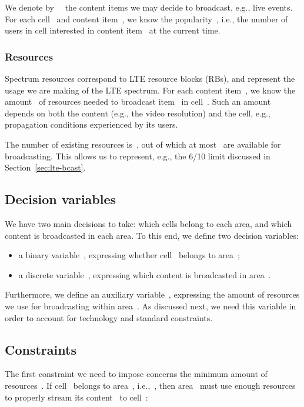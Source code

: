 \documentclass[10pt, conference, compsocconf]{IEEEtran}
\numberwithin{equation}{section}
\begin{document}
We denote by ~\ the content items we may decide to broadcast, e.g., live events.
For each cell~ and content item~, we know the popularity~, i.e., the number of users
in cell  interested in content item~ at the current time.

\subsubsection{Resources}

Spectrum resources correspond to LTE resource blocks (RBs), and represent the usage we are making
of the LTE spectrum.
For each content item~, we know the amount~ of resources needed to 
broadcast item~
in cell~. Such an amount depends on both the content (e.g., the
video resolution) and the cell, e.g., propagation conditions
experienced by its users.

The number of existing resources is~, out of which at most~ are available for broadcasting.
This allows us to represent, e.g., the 6/10 limit discussed in Section~\ref{sec:lte-bcast}.

\subsection{Decision variables}

We have two main decisions to take: which cells belong to each area, and which content is broadcasted
in each area. To this end, we define two decision variables:
\begin{itemize}
\item a binary variable~, expressing whether cell~ belongs to area~;
\item a discrete variable~, expressing which content is broadcasted in area~.
\end{itemize}

Furthermore, we define an auxiliary variable~, expressing the amount of resources we use for
broadcasting within area~. As discussed next, we need this variable in order to account for
technology and standard constraints.

\subsection{Constraints}

The first constraint we need to impose concerns the minimum amount of resources~. If cell~
belongs to area~, i.e.,~, then area~ must use enough resources to properly stream
its content~ to cell~:
\end{document}
